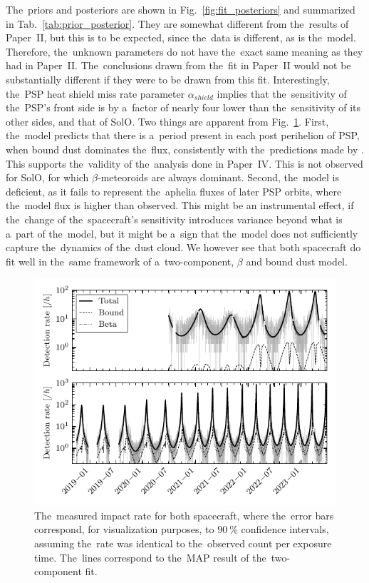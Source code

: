 The~priors and posteriors are shown in Fig.~\ref{fig:fit_posteriors} and summarized in Tab.~\ref{tab:prior_posterior}. They are somewhat different from the~results of Paper~II, but this is to be expected, since the~data is different, as is the~model. Therefore, the~unknown parameters do not have the~exact same meaning as they had in Paper~II. The~conclusions drawn from the~fit in Paper~II would not be substantially different if they were to be drawn from this fit. Interestingly, the~PSP heat shield miss rate parameter $\alpha_{shield}$ implies that the~sensitivity of the~PSP's front side is by a~factor of nearly four lower than the~sensitivity of its other sides, and that of SolO. Two things are apparent from Fig.~\ref{fig:fit_rate}. First, the~model predicts that there is a~period present in each post perihelion of PSP, when bound dust dominates the~flux, consistently with the~predictions made by \citep{szalay2020near,szalay2021collisional}. This supports the~validity of the~analysis done in Paper~IV. This is not observed for SolO, for which $\beta$-meteoroids are always dominant. Second, the~model is deficient, as it fails to represent the~aphelia fluxes of later PSP orbits, where the~model flux is higher than observed. This might be an instrumental effect, if the~change of the~spacecraft's sensitivity introduces variance beyond what is a~part of the~model, but it might be a~sign that the~model does not sufficiently capture the~dynamics of the~dust cloud. We however see that both spacecraft do fit well in the~same framework of a~two-component, $\beta$ and bound dust model. 

\begin{figure}[hb]
 	\centering
 	\includegraphics[width=12cm]{figures/both_shield_rate_log.pdf}
 	\caption{The~measured impact rate for both spacecraft, where the~error bars correspond, for visualization purposes, to $\SI{90}{\%}$ confidence intervals, assuming the~rate was identical to the~observed count per exposure time. The~lines correspond to the~MAP result of the~two-component fit.}
 	\label{fig:fit_rate}
\end{figure}







